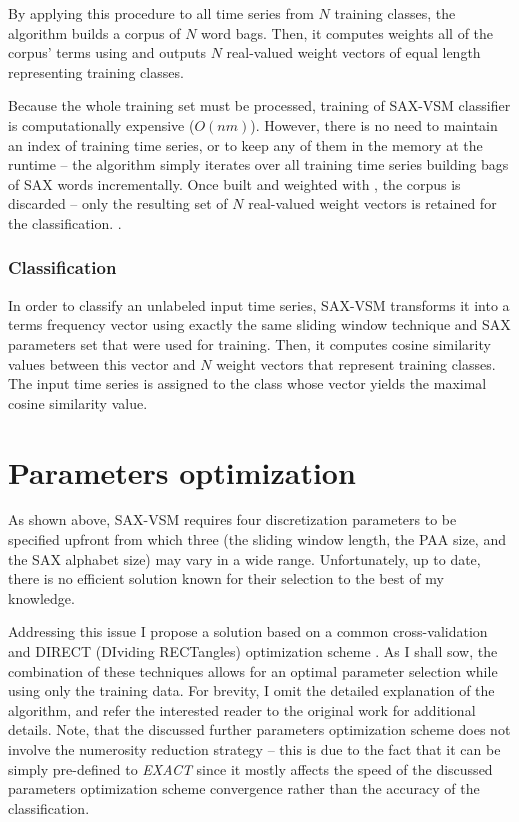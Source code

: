 By applying this procedure to all time series from $N$ training classes, the algorithm builds a corpus of 
$N$ word bags. 
Then, it computes weights all of the corpus' terms using \tfidf and outputs $N$ real-valued weight vectors of 
equal length representing training classes. 

Because the whole training set must be processed, training of SAX-VSM classifier is computationally 
expensive ($O(nm)$). However, there is no need to maintain an index of training time series, or to keep any 
of them in the memory at the runtime -- the algorithm simply iterates over all training time series building 
bags of SAX words incrementally. Once built and weighted with \tfidf, the corpus is discarded -- only the
resulting set of $N$ real-valued weight vectors is retained for the classification.
.
\subsubsection{Classification}
In order to classify an unlabeled input time series, SAX-VSM transforms it into a terms frequency vector using 
exactly the same sliding window technique and SAX parameters set that were used for training. 
Then, it computes cosine similarity values between this vector and $N$ \tfidf weight vectors that represent 
training classes. The input time series is assigned to the class whose vector yields the maximal cosine 
similarity value.

\section{Parameters optimization} \label{section-direct}
As shown above, SAX-VSM requires four discretization parameters to be specified upfront from which three 
(the sliding window length, the PAA size, and the SAX alphabet size) may vary in a wide range. 
Unfortunately, up to date, there is no efficient solution known for their selection to the best 
of my knowledge. 

Addressing this issue I propose a solution based on a common cross-validation and DIRECT (DIviding RECTangles) 
optimization scheme \cite{citeulike:4210208}. As I shall sow, the combination of these techniques allows for 
an optimal parameter selection while using only the training data. For brevity, I omit the detailed explanation 
of the algorithm, and refer the interested reader to the original work \cite{citeulike:12563460} for additional details.
Note, that the discussed further parameters optimization scheme does not involve the numerosity reduction strategy --
this is due to the fact that it can be simply pre-defined to \textit{EXACT} since it mostly affects the speed of the 
discussed parameters optimization scheme convergence rather than the accuracy of the classification. 

